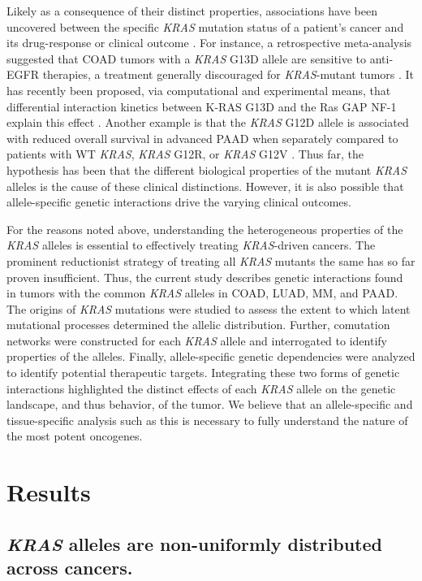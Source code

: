 \documentclass[english, 10pt, letterpaper]{article}
\newcommand{\KRAS}{\emph{KRAS}}
\newcommand{\kras}{K-RAS}
\begin{document}
Likely as a consequence of their distinct properties, associations have been uncovered between the specific \KRAS{} mutation status of a patient's cancer and its drug-response or clinical outcome \cite{Haigis2017, Li2018}.
For instance, a retrospective meta-analysis suggested that COAD tumors with a \KRAS{} G13D allele are sensitive to anti-EGFR therapies, a treatment generally discouraged for \KRAS{}-mutant tumors \cite{DeRoock2010}. 
It has recently been proposed, via computational and experimental means, that differential interaction kinetics between \kras{} G13D and the Ras GAP NF-1 explain this effect \cite{McFall2019, Rabara2019, Zafra2019}.
Another example is that the \KRAS{} G12D allele is associated with reduced overall survival in advanced PAAD when separately compared to patients with WT \KRAS{}, \KRAS{} G12R, or \KRAS{} G12V \cite{Bournet2016}.
Thus far, the hypothesis has been that the different biological properties of the mutant \KRAS{} alleles is the cause of these clinical distinctions.
However, it is also possible that allele-specific genetic interactions drive the varying clinical outcomes.

For the reasons noted above, understanding the heterogeneous properties of the \KRAS{} alleles is essential to effectively treating \KRAS{}-driven cancers.
The prominent reductionist strategy of treating all \KRAS{} mutants the same has so far proven insufficient.
Thus, the current study describes genetic interactions found in tumors with the common \KRAS{} alleles in COAD, LUAD, MM, and PAAD.
The origins of \KRAS{} mutations were studied to assess the extent to which latent mutational processes determined the allelic distribution.
Further, comutation networks were constructed for each \KRAS{} allele and interrogated to identify properties of the alleles.
Finally, allele-specific genetic dependencies were analyzed to identify potential therapeutic targets.
Integrating these two forms of genetic interactions highlighted the distinct effects of each \KRAS{} allele on the genetic landscape, and thus behavior, of the tumor.
We believe that an allele-specific and tissue-specific analysis such as this is necessary to fully understand the nature of the most potent oncogenes.



\section*{Results}

\subsection*{\KRAS{} alleles are non-uniformly distributed across cancers.}
\end{document}
